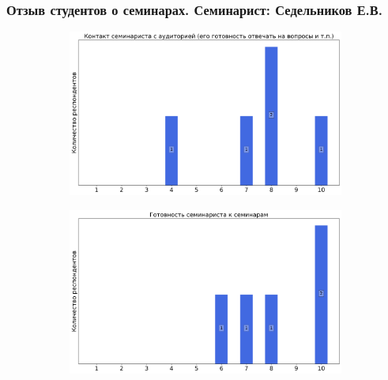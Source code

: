 	\subsubsection{Отзыв студентов о семинарах. Семинарист: Седельников Е.В.}
		\begin{figure}[H]
			\centering
			\begin{subfigure}[b]{0.45\textwidth}
				\centering
				\includegraphics[width=\textwidth]{images/2 course/Общая физика - электричество и магнетизм/seminarists-marks-Седельников Е.В.-0.png}
			\end{subfigure}
			\begin{subfigure}[b]{0.45\textwidth}
				\centering
				\includegraphics[width=\textwidth]{images/2 course/Общая физика - электричество и магнетизм/seminarists-marks-Седельников Е.В.-1.png}
			\end{subfigure}
			\begin{subfigure}[b]{0.45\textwidth}
				\centering

\end{subfigure}
\end{figure}

